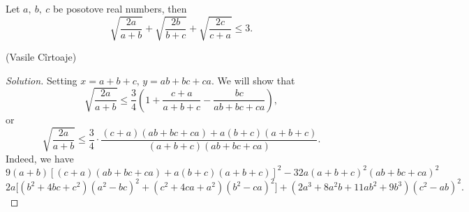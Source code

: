 \documentclass[12pt,a4paper]{book}
\begin{document}
\begin{pro}
Let $a, \ b, \ c$ be posotove real numbers, then
\[\sqrt{\frac{2a}{a+b}}+\sqrt{\frac{2b}{b+c}}+\sqrt{\frac{2c}{c+a}} \le 3.\]
\begin{flushright}(Vasile Cîrtoaje)\end{flushright}
\end{pro}

\begin{proof}[\cmss\problemColor Solution]
Setting $x=a+b+c, \, y = ab+bc+ca.$ We will show that
\[\sqrt{\frac{2a}{a+b}} \le \frac{3}{4}\left(1+\frac{c+a}{a+b+c}-\frac{bc}{ab+bc+ca}\right),\]
or
\[\sqrt{\frac{2a}{a+b}} \le \frac{3}{4} \cdot \frac{(c+a)(ab+bc+ca)+a(b+c)(a+b+c)}{(a+b+c)(ab+bc+ca)}.\]
Indeed, we have
\[9(a+b)[(c+a)(ab+bc+ca)+a(b+c)(a+b+c)]^2-32a(a+b+c)^2(ab+bc+ca)^2\]
\[2a\big[(b^2+4bc+c^2)(a^2-bc)^2 + (c^2+4ca+a^2)(b^2-ca)^2\big] + (2a^3+8a^2b+11ab^2+9b^3)(c^2-ab)^2.\]



\end{proof}
\end{document}
